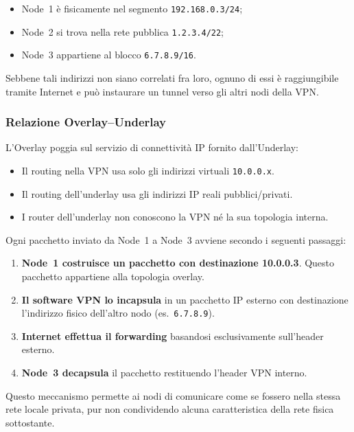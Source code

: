 \begin{itemize}
    \item Node~1 è fisicamente nel segmento \texttt{192.168.0.3/24};
    \item Node~2 si trova nella rete pubblica \texttt{1.2.3.4/22};
    \item Node~3 appartiene al blocco \texttt{6.7.8.9/16}.
\end{itemize}

Sebbene tali indirizzi non siano correlati fra loro, ognuno di essi è raggiungibile tramite Internet e
può instaurare un tunnel verso gli altri nodi della VPN.

\subsubsection{Relazione Overlay–Underlay}

L'Overlay poggia sul servizio di connettività IP fornito dall'Underlay:

\begin{itemize}
    \item Il routing nella VPN usa solo gli indirizzi virtuali \texttt{10.0.0.x}.
    \item Il routing dell’underlay usa gli indirizzi IP reali pubblici/privati.
    \item I router dell’underlay non conoscono la VPN né la sua topologia interna.
\end{itemize}

Ogni pacchetto inviato da Node~1 a Node~3 avviene secondo i seguenti passaggi:

\begin{enumerate}
    \item \textbf{Node~1 costruisce un pacchetto con destinazione 10.0.0.3}.
          Questo pacchetto appartiene alla topologia overlay.
    \item \textbf{Il software VPN lo incapsula} in un pacchetto IP esterno con destinazione
          l'indirizzo fisico dell'altro nodo (es.\ \texttt{6.7.8.9}).
    \item \textbf{Internet effettua il forwarding} basandosi esclusivamente sull'header esterno.
    \item \textbf{Node~3 decapsula} il pacchetto restituendo l’header VPN interno.
\end{enumerate}

Questo meccanismo permette ai nodi di comunicare come se fossero nella stessa rete locale privata,
pur non condividendo alcuna caratteristica della rete fisica sottostante.

